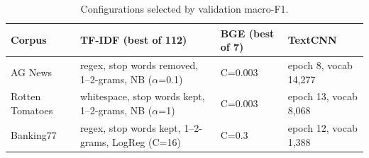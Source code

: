 \begin{table}[H]
\centering
\footnotesize
\caption{Configurations selected by validation macro-F1.}\label{tab:selected}
\begin{tabular}{@{}lP{7.4cm}ll@{}}
\toprule
Corpus & TF-IDF (best of 112) & BGE (best of 7) & TextCNN \\
\midrule
AG News & regex, stop words removed, 1--2-grams, NB ($\alpha$=0.1) & C=0.003 & epoch 8, vocab 14,277 \\
Rotten Tomatoes & whitespace, stop words kept, 1--2-grams, NB ($\alpha$=1) & C=0.003 & epoch 13, vocab 8,068 \\
Banking77 & regex, stop words kept, 1--2-grams, LogReg (C=16) & C=0.3 & epoch 12, vocab 1,388 \\
\bottomrule
\end{tabular}
\end{table}
